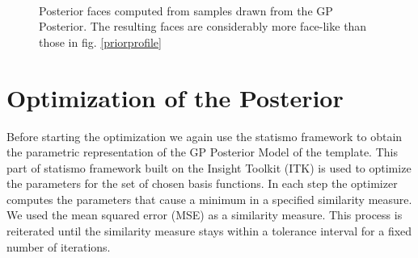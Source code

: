 \begin{figure}[h]
\centering
{}\\
\label{fig:posteriorsample}
\caption{Posterior faces computed from samples drawn from the GP Posterior. The resulting faces are considerably more face-like than those in fig. \ref{priorprofile}}
\end{figure}

\section{Optimization of the Posterior}
Before starting the optimization we again use the statismo framework to obtain the parametric representation of the GP Posterior Model of the template. This part of statismo framework built on the Insight Toolkit (ITK) is used to optimize the parameters for the set of chosen basis functions. In each step the optimizer computes the parameters that cause a minimum in a specified similarity measure. We used the mean squared error (MSE) as a similarity measure. This process is reiterated until the similarity measure stays within a tolerance interval for a fixed
number of iterations.

